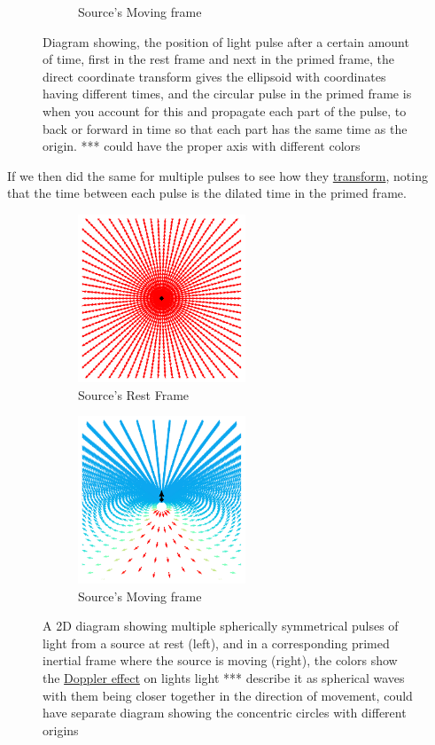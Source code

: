 \begin{figure}[H]
\begin{subfigure}{.32\textwidth}
		\caption{Source's Moving frame}
	\end{subfigure}
	\caption{Diagram showing, the position of light pulse after a certain amount of time, first in the rest frame and next in the primed frame, the direct coordinate transform gives the ellipsoid with coordinates having different times, and the circular pulse in the primed frame is when you account for this and propagate each part of the pulse, to back or forward in time so that each part has the same time as the origin. *** could have the proper axis with different colors}
\end{figure}

If we then did the same for multiple pulses to see how they \hyperlink{def-transform}{transform}, noting that the time between each pulse is the dilated time in the primed frame.

\begin{figure}[H]
	\begin{subfigure}{.49\textwidth}
		\centering
		\includegraphics[width=5cm]{images/pdf/Field_Rest_Frame.pdf}
		\caption{Source's Rest Frame}
	\end{subfigure}
	\begin{subfigure}{.49\textwidth}
		\centering
		\includegraphics[width=5cm]{images/pdf/Field_Moving_Frame_Doppler.pdf}
		\caption{Source's Moving frame}
	\end{subfigure}
	\caption{A 2D diagram showing multiple spherically symmetrical pulses of light from a source at rest (left), and in a corresponding primed inertial frame where the source is moving (right), the colors show the \protect\hyperlink{def-doppler-effect}{Doppler effect} on lights light *** describe it as spherical waves with them being closer together in the direction of movement, could have separate diagram showing the concentric circles with different origins}
	\label{fig: full field transformation}
\end{figure}


